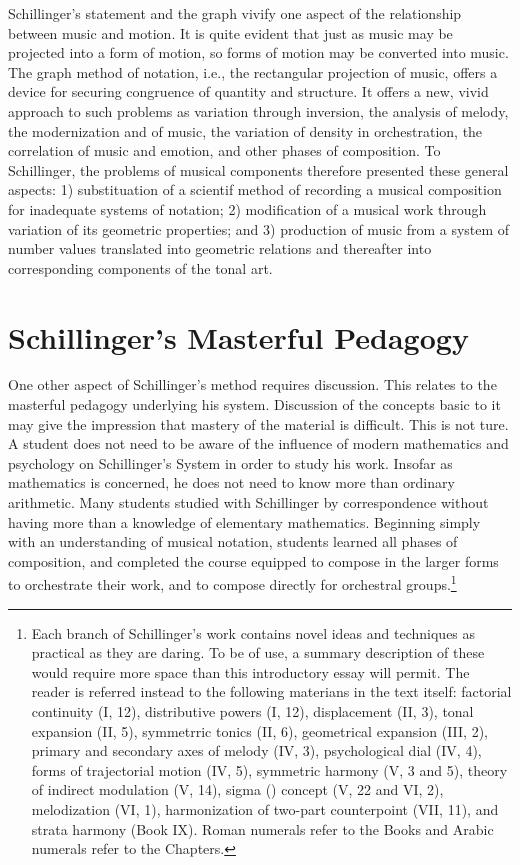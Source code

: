 Schillinger's statement and the graph vivify one aspect of the relationship
between music and motion. It is quite evident that just as music may be
projected into a form of motion, so forms of motion may be converted into
music. The graph method of notation, i.e., the rectangular projection of music,
offers a device for securing congruence of quantity and structure. It offers a
new, vivid approach to such problems as variation through inversion, the
analysis of melody, the modernization and  of music, the
variation of density in orchestration, the correlation of music and emotion,
and other phases of composition. To Schillinger, the problems of musical
components therefore presented these general aspects: 1) substituation of a
scientif method of recording a musical composition for inadequate systems of
notation; 2) modification of a musical work through variation of its geometric
properties; and 3) production of music from a system of number values
translated into geometric relations and thereafter into corresponding
components of the tonal art.

\section{Schillinger's Masterful Pedagogy}

One other aspect of Schillinger's method requires discussion. This relates to
the masterful pedagogy underlying his system. Discussion of the concepts basic
to it may give the impression that mastery of the material is difficult. This
is not ture. A student does not need to be aware of the influence of modern
mathematics and psychology on Schillinger's System in order to study his work.
Insofar as mathematics is concerned, he does not need to know more than
ordinary arithmetic. Many students studied with Schillinger by correspondence
without having more than a knowledge of elementary mathematics. Beginning
simply with an understanding of musical notation, students learned all phases
of composition, and completed the course equipped to compose in the larger
forms to orchestrate their work, and to compose directly for orchestral
groups.\footnote{Each branch of Schillinger's work contains novel ideas and
techniques as practical as they are daring. To be of use, a summary description
of these would require more space than this introductory essay will permit. The
reader is referred instead to the following materians in the text itself:
factorial continuity (I, 12), distributive powers (I, 12), displacement (II,
3), tonal expansion (II, 5), symmetrric tonics (II, 6), geometrical expansion
(III, 2), primary and secondary axes of melody (IV, 3), psychological dial (IV,
4), forms of trajectorial motion (IV, 5), symmetric harmony (V, 3 and 5),
theory of indirect modulation (V, 14), sigma (\Sigma) concept (V, 22 and VI,
2), melodization (VI, 1), harmonization of two-part counterpoint (VII, 11), and
strata harmony (Book IX). Roman numerals refer to the Books and Arabic numerals
refer to the Chapters.}

